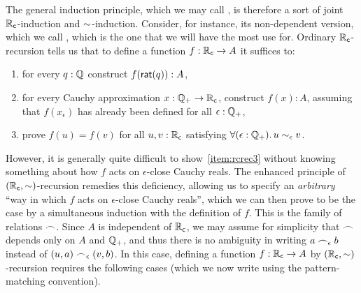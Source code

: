 The general induction principle, which we may call , is therefore a sort of joint $\mathbb{R}_\mathsf{c}$-induction and $\mathord\sim$-induction.
Consider, for instance, its non-dependent version, which we call , which is the one that we will have the most use for.
Ordinary $\mathbb{R}_\mathsf{c}$-recursion tells us that to define a function $f : \mathbb{R}_\mathsf{c} \to A$ it suffices to:
\begin{enumerate}
\item for every $q : \mathbb{Q}$ construct $f(\mathsf{rat}(q)) : A$,
\item for every Cauchy approximation $x : \mathbb{Q}_{+} \to \mathbb{R}_\mathsf{c}$, construct $f(x) : A$,
  assuming that $f(x_\epsilon)$ has already been defined for all $\epsilon : \mathbb{Q}_{+}$,
\item prove $f(u) = f(v)$ for all $u, v : \mathbb{R}_\mathsf{c}$ satisfying $\fall{\epsilon:\Qp} u\close\epsilon v$.\label{item:rcrec3}
\end{enumerate}
However, it is generally quite difficult to show~\ref{item:rcrec3} without knowing something about how $f$ acts on $\epsilon$-close Cauchy reals.
The enhanced principle of $(\mathbb{R}_\mathsf{c},\mathord\sim)$-recursion remedies this deficiency, allowing us to specify an \emph{arbitrary} ``way in which $f$ acts on $\epsilon$-close Cauchy reals'', which we can then prove to be the case by a simultaneous induction with the definition of $f$.
This is the family of relations $\frown$.
Since $A$ is independent of $\mathbb{R}_\mathsf{c}$, we may assume for simplicity that $\frown$ depends only on $A$ and $\mathbb{Q}_{+}$, and thus there is no ambiguity in writing $a\frown_\epsilon b$ instead of $(u,a) \frown_\epsilon (v,b)$.
In this case, defining a function $f:\mathbb{R}_\mathsf{c}\to A$ by $(\mathbb{R}_\mathsf{c},\mathord\sim)$-recursion requires the following cases (which we now write using the pattern-matching convention).
